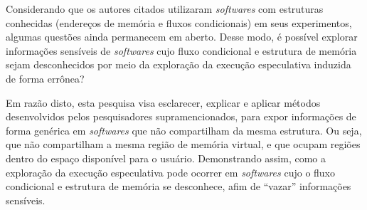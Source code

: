 \documentclass[
	article,			    %
	12pt,				    %
	oneside,			    %
	a4paper,			    %
	chapter=TITLE,		    %
	section=TITLE,		    %
	subsection=TITLE,	    %
	english,			    %
	brazil,				    %
	sumario=tradicional
]{abntex2}
\begin{document}
Considerando que os autores citados utilizaram \emph{softwares} com estruturas conhecidas (endereços de memória e fluxos condicionais) em seus experimentos, algumas questões ainda permanecem em aberto. Desse modo, é possível explorar informações sensíveis de \emph{softwares} cujo fluxo condicional e estrutura de memória sejam desconhecidos por meio da exploração da execução especulativa induzida de forma errônea?

\begin{comment}
\subsection{Problema de Pesquisa}
\citeonline{Kocher2018spectre} em seu artigo, não definiu bem algumas questões sobre a expansão dos ataques que se aproveitam da execução especulativa, como por exemplo se: há ou não possibilidades de vazar informações de softwares cujo fluxo o atacante não conhece; há ou não possibilidade de utilizar endereços de memória desconhecidos inicialmente, para recuperar informações de outros softwares em execução; existe possibilidade de fazer tais ataques em softwares de terceiros.

Isto porquê, quando se descreveu os ataques utilizando a execução especulativa, os experimentos e testes demonstrados foram feitos em softwares criados pelos próprios descobridores da vulnerabilidade. Ou seja, eles possuíam endereços de memória e fluxos condicionais bem definidos para garimpar as informações sigilosas. Diante disto, é proposto uma pesquisa para responder: é possível explorar informações sensíveis de softwares cujo fluxo condicional e estrutura de memória sejam desconhecidos por meio do emprego da execução especulativa?
\end{comment}
Em razão disto, esta pesquisa visa esclarecer, explicar e aplicar métodos desenvolvidos pelos pesquisadores supramencionados, para expor informações de forma genérica em \emph{softwares} que não compartilham da mesma estrutura. Ou seja, que não compartilham a mesma região de memória virtual, e que ocupam regiões dentro do espaço disponível para o usuário. Demonstrando assim, como a exploração da execução especulativa pode ocorrer em \emph{softwares} cujo o fluxo condicional e estrutura de memória se desconhece, afim de ``vazar'' informações sensíveis.
\end{document}
